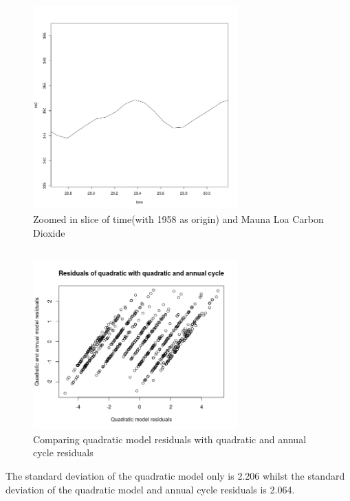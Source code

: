 \documentclass[paper=a4, fontsize=11pt]{scrartcl}
\numberwithin{equation}{section} %
\numberwithin{figure}{section} %
\numberwithin{table}{section} %
\begin{document}
\begin{figure}[htp]
	\centering
	\includegraphics[width=0.7\textwidth, clip]{q2bZoom.png} 
	\caption{Zoomed in slice of time(with 1958 as origin) and Mauna Loa Carbon Dioxide}
\end{figure}
\pagebreak
\subsection{}

\begin{figure}[htp]
	\centering
	\includegraphics[width=0.7\textwidth, clip]{q2c.png} 
	\caption{Comparing quadratic model residuals with quadratic and annual cycle residuals}
\end{figure}

The standard deviation of the quadratic model only is 2.206 whilst the standard deviation of the quadratic model and annual cycle residuals is 2.064.
\end{document}
